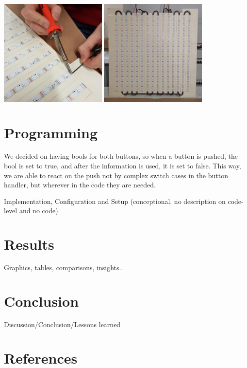 \documentclass[a4paper,12pt]{article}
\begin{document}
{ \centering
  \includegraphics[width = 0.4\textwidth]{loten.jpg}
  \space{   }
  \includegraphics[width = 0.4\textwidth]{matrix.jpg}
  \\}
 \vspace{1cm}
 
\section{Programming}
 We decided on having bools for both buttons, so when a button is pushed, the bool is set to true, and after the information is used, it is set to false.
 This way, we are able to react on the push not by complex switch cases in the button handler, but wherever in the code they are needed.
 
 
Implementation, Configuration and Setup (conceptional, no description
on code-level and no code)

\section{Results}
Graphics, tables, comparisons, insights..

\section{Conclusion}

Discussion/Conclusion/Lessons learned

\section{References}
\end{document}
